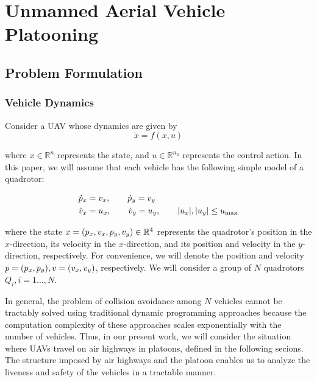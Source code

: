 \section{Unmanned Aerial Vehicle Platooning \label{sec:platooning}}
\subsection{Problem Formulation}
\subsubsection{Vehicle Dynamics}
Consider a UAV whose dynamics are given by
\begin{equation}
\dot{x} = f(x,u)
\end{equation}

\noindent where $x\in\mathbb{R}^n$ represents the state, and $u\in\mathbb{R}^{n_u}$ represents the control action. In this paper, we will assume that each vehicle has the following simple model of a quadrotor:

\begin{equation} \label{eq:dyn}
\begin{aligned}
\dot{p}_x &= v_x, \qquad \dot{p}_y = v_y  \\
\dot{v}_x &= u_x, \qquad \dot{v}_y = u_y, \qquad |u_x|,|u_y| \le u_\text{max}
\end{aligned}
\end{equation}

\noindent where the state $x=(p_x, v_x, p_y, v_y)\in\mathbb{R}^4$ represents the quadrotor's position in the $x$-direction, its velocity in the $x$-direction, and its position and velocity in the $y$-direction, respectively. For convenience, we will denote the position and velocity $p=(p_x, p_y),v=(v_x,v_y)$, respectively. We will consider a group of $N$ quadrotors $Q_i, i=1\ldots,N$.

In general, the problem of collision avoidance among $N$ vehicles cannot be tractably solved using traditional dynamic programming approaches because the computation complexity of these approaches scales exponentially with the number of vehicles. Thus, in our present work, we will consider the situation where UAVs travel on air highways in platoons, defined in the following secions. The structure imposed by air highways and the platoon enables us to analyze the liveness and safety of the vehicles in a tractable manner.

